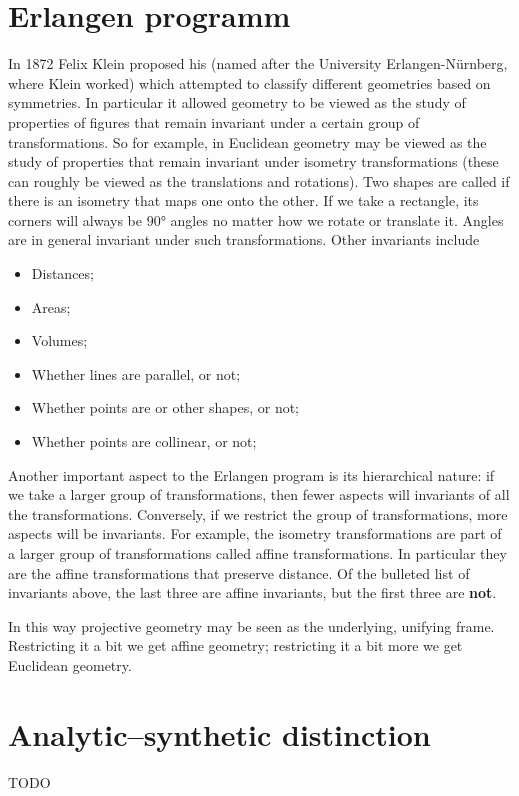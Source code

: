 \section{Erlangen programm}
In 1872 Felix Klein proposed his  (named after the University Erlangen-Nürnberg, where Klein worked) which attempted to classify different geometries based on symmetries. In particular it allowed geometry to be viewed as the study of properties of figures that remain invariant under a certain group of transformations. So for example, in Euclidean geometry may be viewed as the study of properties that remain invariant under isometry transformations (these can roughly be viewed as the translations and rotations). Two shapes are called  if there is an isometry that maps one onto the other. If we take a rectangle, its corners will always be $90\si{\degree}$ angles no matter how we rotate or translate it. Angles are in general invariant under such transformations. Other invariants include
\begin{itemize}
\item Distances;
\item Areas;
\item Volumes;
\item Whether lines are parallel, or not;
\item Whether points are or other shapes, or not;
\item Whether points are collinear, or not;
\end{itemize}

Another important aspect to the Erlangen program is its hierarchical nature: if we take a larger group of transformations, then fewer aspects will invariants of all the transformations. Conversely, if we restrict the group of transformations, more aspects will be invariants. For example, the isometry transformations are part of a larger group of transformations called affine transformations. In particular they are the affine transformations that preserve distance. Of the bulleted list of invariants above, the last three are affine invariants, but the first three are \textbf{not}.

In this way projective geometry may be seen as the underlying, unifying frame. Restricting it a bit we get affine geometry; restricting it a bit more we get Euclidean geometry.

\section{Analytic–synthetic distinction}
TODO

